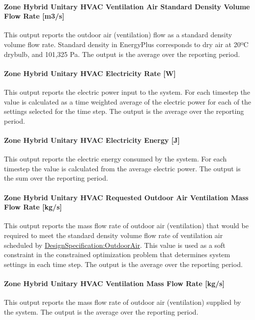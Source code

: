 \paragraph{Zone Hybrid Unitary HVAC Ventilation Air Standard Density Volume Flow Rate [m3/s]}
This output reports the outdoor air (ventilation) flow as a standard density volume flow rate. Standard density in EnergyPlus corresponds to dry air at 20ºC drybulb, and 101,325 Pa. The output is the average over the reporting period.

\paragraph{Zone Hybrid Unitary HVAC Electricity Rate [W]}
This output reports the electric power input to the system. For each timestep the value is calculated as a time weighted average of the electric power for each of the settings selected for the time step. The output is the average over the reporting period.

\paragraph{Zone Hybrid Unitary HVAC Electricity Energy [J]}
This output reports the electric energy consumed by the system. For each timestep the value is calculated from the average electric power. The output is the sum over the reporting period.

\paragraph{Zone Hybrid Unitary HVAC Requested Outdoor Air Ventilation Mass Flow Rate [kg/s]}
This output reports the mass flow rate of outdoor air (ventilation) that would be required to meet the standard density volume flow rate of ventilation air scheduled by \hyperref[designspecificationoutdoorair]{DesignSpecification:OutdoorAir}. This value is used as a soft constraint in the constrained optimization problem that determines system settings in each time step. The output is the average over the reporting period.

\paragraph{Zone Hybrid Unitary HVAC Ventilation Mass Flow Rate [kg/s]}
This output reports the mass flow rate of outdoor air (ventilation) supplied by the system. The output is the average over the reporting period.

